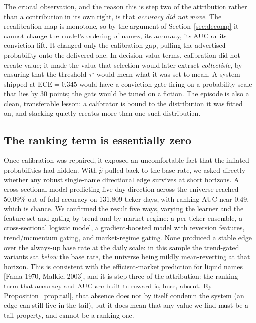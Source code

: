 \documentclass[10pt, a4paper, oneside]{article}
\theoremstyle{definition}
\theoremstyle{plain}
\newcommand{\ece}{\mathrm{ECE}}
\newcommand{\Pup}{\hat p}
\begin{document}
The crucial observation, and the reason this is step two of the attribution rather than
a contribution in its own right, is that \emph{accuracy did not move}. The
recalibration map is monotone, so by the argument of Section~\ref{sec:decomp} it cannot
change the model's ordering of names, its accuracy, its AUC or its conviction lift. It
changed only the calibration gap, pulling the advertised probability onto the delivered
one. In decision-value terms, calibration did not create value; it made the value that
selection would later extract \emph{collectible}, by ensuring that the threshold
$\tau^\star$ would mean what it was set to mean. A system shipped at $\ece=0.345$ would
have a conviction gate firing on a probability scale that lies by 30 points; the gate
would be tuned on a fiction. The episode is also a clean, transferable lesson: a
calibrator is bound to the distribution it was fitted on, and stacking quietly creates
more than one such distribution.

\subsection{The ranking term is essentially zero}
\label{sec:ceiling}
Once calibration was repaired, it exposed an uncomfortable fact that the inflated
probabilities had hidden. With $\Pup$ pulled back to the base rate, we asked directly whether any robust
single-name directional edge survives at short horizons. A cross-sectional model
predicting five-day direction across the universe reached 50.09\% out-of-fold accuracy
on 131{,}809 ticker-days, with ranking AUC near 0.49, which is chance. We confirmed the result
five ways, varying the learner and the feature set and gating by trend and by market
regime: a per-ticker ensemble, a cross-sectional logistic model, a gradient-boosted
model with reversion features, trend/momentum gating, and market-regime gating. None
produced a stable edge over the always-up base rate at the daily scale; in this
sample the trend-gated variants sat \emph{below} the base rate, the universe being
mildly mean-reverting at that horizon. This is consistent with the efficient-market
prediction for liquid names [Fama 1970, Malkiel 2003], and it is step three of the
attribution: the ranking term that accuracy and AUC are built to reward is, here,
absent. By Proposition~\ref{prop:tail}, that absence does not by itself condemn the
system (an edge can still live in the tail), but it does mean that any value we find
must be a tail property, and cannot be a ranking one.
\end{document}
